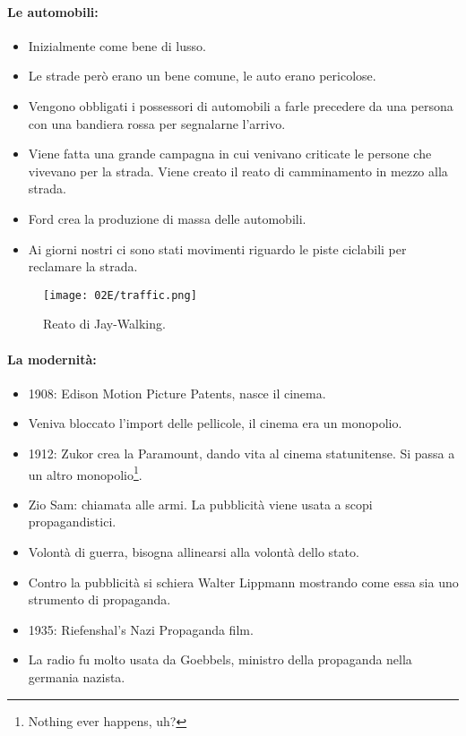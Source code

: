 \paragraph{Le automobili:}

\begin{itemize}
  \item Inizialmente come bene di lusso. 
  \item Le strade però erano un bene comune, le auto erano pericolose. 
  \item Vengono obbligati i possessori di automobili a farle precedere da una persona con una bandiera rossa per segnalarne l'arrivo. 
  \item Viene fatta una grande campagna in cui venivano criticate le persone che vivevano per la strada. Viene creato il reato di camminamento in mezzo alla strada.
  \item Ford crea la produzione di massa delle automobili.
  \item Ai giorni nostri ci sono stati movimenti riguardo le piste ciclabili per reclamare la strada.
\end{itemize}

\begin{figure}[H]
    \centering
    \texttt{[image: 02E/traffic.png]}
    \caption{Reato di Jay-Walking.}
\end{figure}

\paragraph{La modernità:}

\begin{itemize}
  \item 1908: Edison Motion Picture Patents, nasce il cinema. 
  \item Veniva bloccato l'import delle pellicole, il cinema era un monopolio. 
  \item 1912: Zukor crea la Paramount, dando vita al cinema statunitense. Si passa a un altro monopolio\footnote{Nothing ever happens, uh?}.
  \item Zio Sam: chiamata alle armi. La pubblicità viene usata a scopi propagandistici.
  \item Volontà di guerra, bisogna allinearsi alla volontà dello stato. 
  \item Contro la pubblicità si schiera Walter Lippmann mostrando come essa sia uno strumento di propaganda. 
  \item 1935: Riefenshal's Nazi Propaganda film. 
  \item La radio fu molto usata da Goebbels,  ministro della propaganda nella germania nazista.
\end{itemize}















